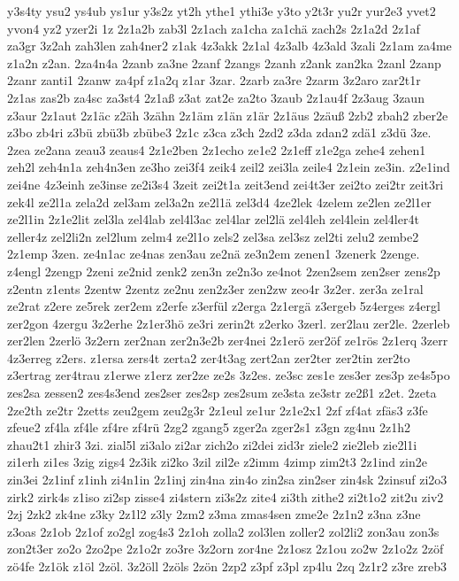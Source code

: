 {y3s4ty
ysu2
ys4ub
ys1ur
y3s2z
yt2h
ythe1
ythi3e
y3to
y2t3r
yu2r
yur2e3
yvet2
yvon4
yz2
yzer2i
1z
2z1a2b
zab3l
2z1ach
za1cha
za1chä
zach2s
2z1a2d
2z1af
za3gr
3z2ah
zah3len
zah4ner2
z1ak
4z3akk
2z1al
4z3alb
4z3ald
3zali
2z1am
za4me
z1a2n
z2an.
2za4n4a
2zanb
za3ne
2zanf
2zangs
2zanh
z2ank
zan2ka
2zanl
2zanp
2zanr
zanti1
2zanw
za4pf
z1a2q
z1ar
3zar.
2zarb
za3re
2zarm
3z2aro
zar2t1r
2z1as
zas2b
za4sc
za3st4
2z1aß
z3at
zat2e
za2to
3zaub
2z1au4f
2z3aug
3zaun
z3aur
2z1aut
2z1äc
z2äh
3zähn
2z1äm
z1än
z1är
2z1äus
2zäuß
2zb2
zbah2
zber2e
z3bo
zb4ri
z3bü
zbü3b
zbübe3
2z1c
z3ca
z3ch
2zd2
z3da
zdan2
zdä1
z3dü
3ze.
2zea
ze2ana
zeau3
zeaus4
2z1e2ben
2z1echo
ze1e2
2z1eff
z1e2ga
zehe4
zehen1
zeh2l
zeh4n1a
zeh4n3en
ze3ho
zei3f4
zeik4
zeil2
zei3la
zeile4
2z1ein
ze3in.
z2e1ind
zei4ne
4z3einh
ze3inse
ze2i3s4
3zeit
zei2t1a
zeit3end
zei4t3er
zei2to
zei2tr
zeit3ri
zek4l
ze2l1a
zela2d
zel3am
zel3a2n
ze2l1ä
zel3d4
4ze2lek
4zelem
ze2len
ze2l1er
ze2l1in
2z1e2lit
zel3la
zel4lab
zel4l3ac
zel4lar
zel2lä
zel4leh
zel4lein
zel4ler4t
zeller4z
zel2li2n
zel2lum
zelm4
ze2l1o
zels2
zel3sa
zel3sz
zel2ti
zelu2
zembe2
2z1emp
3zen.
ze4n1ac
ze4nas
zen3au
ze2nä
ze3n2em
zenen1
3zenerk
2zenge.
z4engl
2zengp
2zeni
ze2nid
zenk2
zen3n
ze2n3o
ze4not
2zen2sem
zen2ser
zens2p
z2entn
z1ents
2zentw
2zentz
ze2nu
zen2z3er
zen2zw
zeo4r
3z2er.
zer3a
ze1ral
ze2rat
z2ere
ze5rek
zer2em
z2erfe
z3erfül
z2erga
2z1ergä
z3ergeb
5z4erges
z4ergl
zer2gon
4zergu
3z2erhe
2z1er3hö
ze3ri
zerin2t
z2erko
3zerl.
zer2lau
zer2le.
2zerleb
zer2len
2zerlö
3z2ern
zer2nan
zer2n3e2b
zer4nei
2z1erö
zer2öf
ze1rös
2z1erq
3zerr
4z3erreg
z2ers.
z1ersa
zers4t
zerta2
zer4t3ag
zert2an
zer2ter
zer2tin
zer2to
z3ertrag
zer4trau
z1erwe
z1erz
zer2ze
ze2s
3z2es.
ze3sc
zes1e
zes3er
zes3p
ze4s5po
zes2sa
zessen2
zes4s3end
zes2ser
zes2sp
zes2sum
ze3sta
ze3str
ze2ß1
z2et.
2zeta
2ze2th
ze2tr
2zetts
zeu2gem
zeu2g3r
2z1eul
ze1ur
2z1e2x1
2zf
zf4at
zfäs3
z3fe
zfeue2
zf4la
zf4le
zf4re
zf4rü
2zg2
zgang5
zger2a
zger2s1
z3gn
zg4nu
2z1h2
zhau2t1
zhir3
3zi.
zial5l
zi3alo
zi2ar
zich2o
zi2dei
zid3r
ziele2
zie2leb
zie2l1i
zi1erh
zi1es
3zig
zigs4
2z3ik
zi2ko
3zil
zil2e
z2imm
4zimp
zim2t3
2z1ind
zin2e
zin3ei
2z1inf
z1inh
zi4n1in
2z1inj
zin4na
zin4o
zin2sa
zin2ser
zin4sk
2zinsuf
zi2o3
zirk2
zirk4s
z1iso
zi2sp
zisse4
zi4stern
zi3s2z
zite4
zi3th
zithe2
zi2t1o2
zit2u
ziv2
2zj
2zk2
zk4ne
z3ky
2z1l2
z3ly
2zm2
z3ma
zmas4sen
zme2e
2z1n2
z3na
z3ne
z3oas
2z1ob
2z1of
zo2gl
zog4s3
2z1oh
zolla2
zol3len
zoller2
zol2li2
zon3au
zon3s
zon2t3er
zo2o
2zo2pe
2z1o2r
zo3re
3z2orn
zor4ne
2z1osz
2z1ou
zo2w
2z1o2z
2zöf
zö4fe
2z1ök
z1öl
2zöl.
3z2öll
2zöls
2zön
2zp2
z3pf
z3pl
zp4lu
2zq
2z1r2
z3re
zreb3
}

